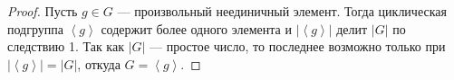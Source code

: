 \begin{proof}
  Пусть $g \in G$ --- произвольный неединичный элемент.
  Тогда циклическая подгруппа $\left< g \right>$
  содержит более одного элемента и $\left| \left< g \right> \right|$
  делит $\left| G \right|$ по следствию 1.
  Так как $\left| G \right|$ --- простое число, то
  последнее возможно только при $\left| \left< g \right> \right| 
  = \left| G \right|$, откуда $G = \left< g \right>$.
\end{proof}

